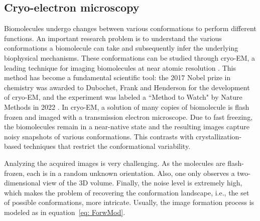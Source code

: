 \documentclass[12pt]{iopart}
\theoremstyle{remark}
\begin{document}
\subsection{Cryo-electron microscopy}
\label{sec: cryo-EM}
Biomolecules undergo changes between various conformations to perform different functions.
An important research problem is to understand the various conformations a biomolecule can take and subsequently infer the underlying biophysical mechanisms. These conformations can be studied through cryo-EM, a 
leading technique for imaging biomolecules at near atomic resolution \citep{nakane2020single}. 
This method has become a fundamental scientific tool: the 2017 Nobel prize in chemistry was awarded to Dubochet, Frank and Henderson for the development of cryo-EM, and the experiment was labeled 
a ``Method to Watch"  by Nature Methods in 2022 \citep{doerr2022dynamic}. 
In cryo-EM, a solution of many copies of biomolecule is flash frozen and imaged with a transmission electron microscope.
Due to fast freezing, the biomolecules remain in a near-native state and the resulting images capture noisy snapshots of various conformations. This contrasts with crystallization-based techniques that restrict the conformational variability. 


Analyzing the acquired images is very challenging. 
As the molecules are flash-frozen, each is in a random unknown orientation. Also, one only observes a two-dimensional view of the 3D volume.  Finally, the noise level is extremely high, which makes the problem of recovering the conformation landscape, i.e., the set of possible conformations, more intricate. Usually, the image formation process is modeled as in equation~\eqref{eq: ForwMod}.
\end{document}
